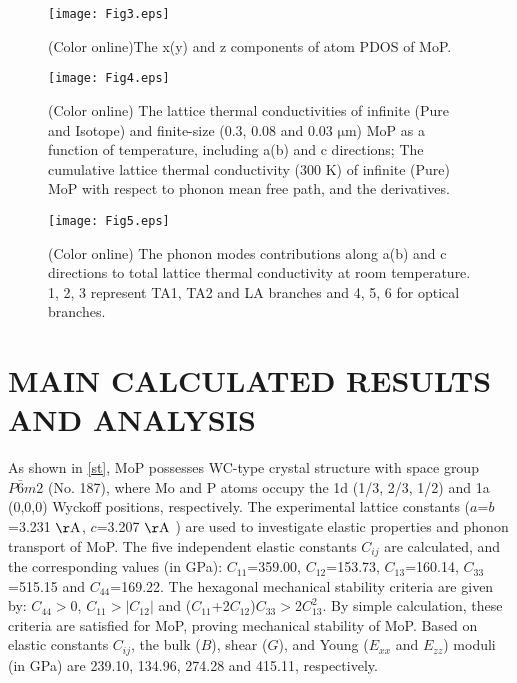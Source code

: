 \documentclass[twocolumn,showkeys,aps,prb,showpacs]{revtex4-1}
\begin{document}
\begin{figure}
  \texttt{[image: Fig3.eps]}
  \caption{(Color online)The x(y) and z components of atom PDOS of MoP.}\label{ph1}
\end{figure}
\begin{figure*}[!htb]
  \texttt{[image: Fig4.eps]}
  \caption{(Color online) The lattice thermal conductivities  of infinite (Pure and Isotope) and finite-size (0.3, 0.08 and 0.03 $\mathrm{\mu m}$) MoP as a function of temperature, including a(b)  and c directions; The cumulative lattice thermal conductivity (300 K) of  infinite (Pure) MoP with respect to phonon mean free path, and the derivatives.}\label{kl}
\end{figure*}

\begin{figure}
  \texttt{[image: Fig5.eps]}
  \caption{(Color online) The phonon modes contributions along a(b) and c directions to total lattice thermal conductivity at room temperature. 1, 2, 3 represent TA1, TA2 and LA branches and 4, 5, 6 for optical branches.}\label{mkl}
\end{figure}

\section{MAIN CALCULATED RESULTS AND ANALYSIS}
 As shown in \autoref{st},  MoP  possesses  WC-type crystal structure with space group  $P\bar{6}m2$ (No. 187), where Mo and
P atoms occupy the 1d (1/3, 2/3, 1/2) and 1a (0,0,0) Wyckoff positions, respectively. The experimental lattice constants ($a$=$b$=3.231 $\mathrm{{\AA}}$, $c$=3.207 $\mathrm{{\AA}}$ ) are used to investigate elastic properties and phonon transport of MoP\cite{q14}.
The five independent elastic  constants $C_{ij}$  are calculated, and the corresponding values (in
GPa): $C_{11}$=359.00, $C_{12}$=153.73, $C_{13}$=160.14,
$C_{33}$=515.15  and  $C_{44}$=169.22.
The hexagonal mechanical stability criteria are given by\cite{q15}: $C_{44}$$>$0, $C_{11}$$>$$|C_{12}|$ and ($C_{11}$+2$C_{12}$)$C_{33}$$>$2$C_{13}^2$.
By simple calculation, these criteria are satisfied for MoP, proving mechanical stability of MoP. Based on  elastic  constants $C_{ij}$, the bulk ($B$), shear ($G$), and Young ($E_{xx}$ and $E_{zz}$) moduli  (in
GPa) are 239.10, 134.96, 274.28  and 415.11, respectively.
\end{document}
